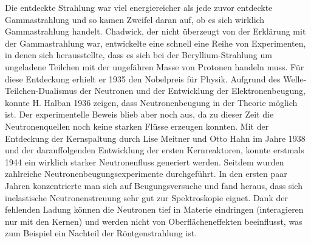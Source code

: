 Die entdeckte Strahlung war viel energiereicher als jede zuvor entdeckte Gammastrahlung und so kamen Zweifel daran auf, ob es sich wirklich Gammastrahlung handelt. Chadwick, der nicht überzeugt von der Erklärung mit der Gammastrahlung war, entwickelte eine schnell eine Reihe von Experimenten, in denen sich herausstellte, dass es sich bei der Beryllium-Strahlung um ungeladene Teilchen mit der ungefähren Masse von Protonen handeln muss. Für diese Entdeckung erhielt er 1935 den Nobelpreis für Physik.
Aufgrund des Welle-Teilchen-Dualismus der Neutronen und der Entwicklung der Elektronenbeugung, konnte H. Halban 1936 zeigen, dass Neutronenbeugung in der Theorie möglich ist. Der experimentelle Beweis blieb aber noch aus, da zu dieser Zeit die Neutronenquellen noch keine starken Flüsse erzeugen konnten. Mit der Entdeckung der Kernspaltung durch Lise Meitner und Otto Hahn im Jahre 1938 und der darauffolgenden Entwicklung der ersten Kernreaktoren, konnte erstmals 1944 ein wirklich starker Neutronenfluss generiert werden. Seitdem wurden zahlreiche Neutronenbeugungsexperimente durchgeführt. In den ersten paar Jahren konzentrierte man sich auf Beugungsversuche und fand heraus, dass sich inelastische Neutronenstreuung sehr gut zur Spektroskopie eignet. Dank der fehlenden Ladung können die Neutronen tief in Materie eindringen (interagieren nur mit den Kernen) und werden nicht von Oberflächeneffekten beeinflusst, was zum Beispiel ein Nachteil der Röntgenstrahlung ist.
